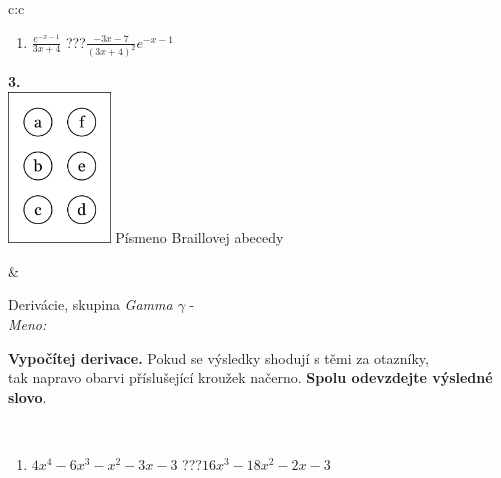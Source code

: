 \documentclass[10pt]{report}
\begin{document}
\begin{tabular}{c:c}
\begin{minipage}[c][104.5mm][t]{0.5\linewidth}
\begin{center}
\begin{minipage}{0.79\linewidth}
\begin{center}
\begin{varwidth}{\linewidth}
\begin{enumerate}
\item $\frac{e^{-x-1}}{3x+4}$\quad \dotfill\; ???\;\dotfill \quad $\frac{-3x-7}{(3x+4)^2}e^{-x-1}$
\end{enumerate}
\end{varwidth}
\end{center}
\end{minipage}
\begin{minipage}{0.20\linewidth}
\begin{center}
{\Huge\bfseries 3.} \\[2mm]
\includegraphics[height=40mm]{../images/braille.png}
{\small Písmeno Braillovej abecedy}
\end{center}
\end{minipage}
\end{center}
\end{minipage}
&
\begin{minipage}[c][104.5mm][t]{0.5\linewidth}
\begin{center}
\vspace{7mm}
{\huge Derivácie, skupina \textit{Gamma $\gamma$} -}\\[5mm]
\textit{Meno:}\phantom{xxxxxxxxxxxxxxxxxxxxxxxxxxxxxxxxxxxxxxxxxxxxxxxxxxxxxxxxxxxxxxxxx}\\[5mm]
\begin{minipage}{0.95\linewidth}
\begin{center}
\textbf{Vypočítej derivace.} Pokud se výsledky shodují s těmi za otazníky,\\tak napravo obarvi příslušející kroužek načerno. \textbf{Spolu odevzdejte výsledné slovo}.
\end{center}
\end{minipage}
\\[1mm]
\begin{minipage}{0.79\linewidth}
\begin{center}
\begin{varwidth}{\linewidth}
\begin{enumerate}
\normalsize
\item $4x^4-6x^3-x^2-3x-3$\quad \dotfill\; ???\;\dotfill \quad $16x^3-18x^2-2x-3$

\end{enumerate}
\end{varwidth}
\end{center}
\end{minipage}
\end{center}
\end{minipage}
\end{tabular}
\end{document}
